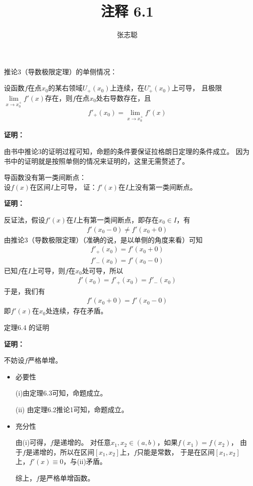 \documentclass{article}
\begin{document}
\title{注释 6.1}
\author{张志聪}
\maketitle

\begin{zremark}
  推论3（导数极限定理）的单侧情况：

  设函数$f$在点$x_0$的某右领域$U_+(x_0)$上连续，在$U_+^{\circ}(x_0)$上可导，
  且极限$\lim\limits_{x \to x_0^+} f'(x)$存在，则$f$在点$x_0$处右导数存在，且
  \begin{align*}
    f'_+(x_0) = \lim\limits_{x \to x_0^+} f'(x)
  \end{align*}
\end{zremark}

\textbf{证明：}

由书中推论3的证明过程可知，命题的条件要保证拉格朗日定理的条件成立。
因为书中的证明就是按照单侧的情况来证明的，这里无需赘述了。

\begin{zremark}
  导函数没有第一类间断点：\\
  设$f(x)$在区间$I$上可导， 证：$f'(x)$在$I$上没有第一类间断点。
\end{zremark}

\textbf{证明：}

反证法，假设$f'(x)$在$I$上有第一类间断点，即存在$x_0 \in I$，有
\begin{align*}
  f'(x_0 - 0) \neq f'(x_0 + 0)
\end{align*}
由推论3（导数极限定理）（准确的说，是以单侧的角度来看）可知
\begin{align*}
  f'_+(x_0) = f'(x_0 + 0) \\
  f'_-(x_0) = f'(x_0 - 0) 
\end{align*}
已知$f$在$I$上可导，则$f$在$x_0$处可导，所以
\begin{align*}
  f'(x_0) = f'_+(x_0) = f'_-(x_0)
\end{align*}
于是，我们有
\begin{align*}
  f'(x_0 + 0) = f'(x_0 - 0) 
\end{align*}
即$f'(x)$在$x_0$处连续，存在矛盾。

\begin{zremark}
  定理6.4 的证明
\end{zremark}

\textbf{证明：}

不妨设$f$严格单增。

\begin{itemize}
  \item 必要性

        (i)由定理6.3可知，命题成立。

        (ii) 由定理6.2推论1可知，命题成立。

  \item 充分性

        由(i)可得，$f$是递增的。
        对任意$x_1, x_2 \in (a, b)$，如果$f(x_1) = f(x_2)$，
        由于$f$是递增的，所以在区间$[x_1, x_2]$上，$f$只能是常数，
        于是在区间$[x_1, x_2]$上，$f'(x) \equiv 0$，与(ii)矛盾。

        综上，$f$是严格单增函数。
\end{itemize}
\end{document}
